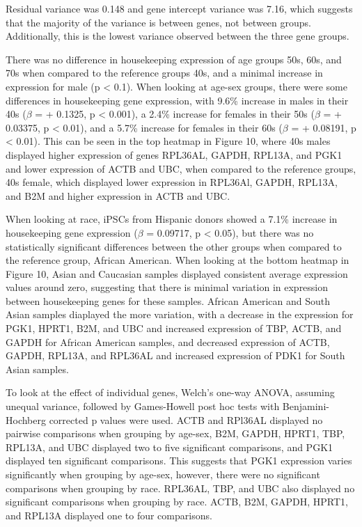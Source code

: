 \documentclass[
  letterpaper,
  DIV=11,
  numbers=noendperiod]{scrartcl}
\begin{document}
Residual variance was 0.148 and gene intercept variance was 7.16, which
suggests that the majority of the variance is between genes, not between
groups. Additionally, this is the lowest variance observed between the
three gene groups.

There was no difference in housekeeping expression of age groups 50s,
60s, and 70s when compared to the reference groups 40s, and a minimal
increase in expression for male (p \textless{} 0.1). When looking at
age-sex groups, there were some differences in housekeeping gene
expression, with 9.6\% increase in males in their 40s (\(\beta\) = +
0.1325, p \textless{} 0.001), a 2.4\% increase for females in their 50s
(\(\beta\) = + 0.03375, p \textless{} 0.01), and a 5.7\% increase for
females in their 60s (\(\beta\) = + 0.08191, p \textless{} 0.01). This
can be seen in the top heatmap in Figure 10, where 40s males displayed
higher expression of genes RPL36AL, GAPDH, RPL13A, and PGK1 and lower
expression of ACTB and UBC, when compared to the reference groups, 40s
female, which displayed lower expression in RPL36Al, GAPDH, RPL13A, and
B2M and higher expression in ACTB and UBC.

When looking at race, iPSCs from Hispanic donors showed a 7.1\% increase
in housekeeping gene expression (\(\beta\) = 0.09717, p \textless{}
0.05), but there was no statistically significant differences between
the other groups when compared to the reference group, African American.
When looking at the bottom heatmap in Figure 10, Asian and Caucasian
samples displayed consistent average expression values around zero,
suggesting that there is minimal variation in expression between
housekeeping genes for these samples. African American and South Asian
samples diaplayed the more variation, with a decrease in the expression
for PGK1, HPRT1, B2M, and UBC and increased expression of TBP, ACTB, and
GAPDH for African American samples, and decreased expression of ACTB,
GAPDH, RPL13A, and RPL36AL and increased expression of PDK1 for South
Asian samples.

To look at the effect of individual genes, Welch's one-way ANOVA,
assuming unequal variance, followed by Games-Howell post hoc tests with
Benjamini-Hochberg corrected p values were used. ACTB and RPl36AL
displayed no pairwise comparisons when grouping by age-sex, B2M, GAPDH,
HPRT1, TBP, RPL13A, and UBC displayed two to five significant
comparisons, and PGK1 displayed ten significant comparisons. This
suggests that PGK1 expression varies significantly when grouping by
age-sex, however, there were no significant comparisons when grouping by
race. RPL36AL, TBP, and UBC also displayed no significant comparisons
when grouping by race. ACTB, B2M, GAPDH, HPRT1, and RPL13A displayed one
to four comparisons.
\end{document}
